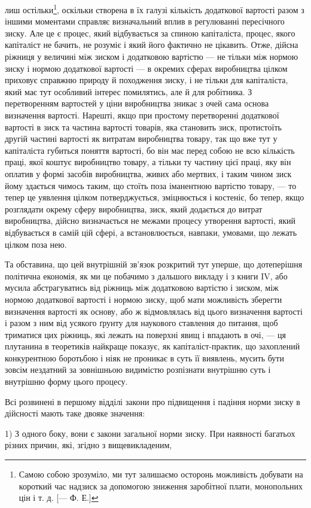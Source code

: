 \parcont{}  %
лиш остільки\footnote{
Самою собою зрозуміло, ми тут залишаємо осторонь можливість добувати
на короткий час надзиск за допомогою зниження заробітної плати, монопольних
цін і т. д. [— Ф. Е.]
}, оскільки створена в їх галузі кількість додаткової вартості разом з іншими моментами
справляє визначальний вплив в регулюванні пересічного зиску. Але це є процес, який відбувається за
спиною капіталіста, процес, якого капіталіст
не бачить, не розуміє і який його фактично не цікавить. Отже,
дійсна ріжниця у величині між зиском і додатковою вартістю — не тільки між нормою зиску і нормою
додаткової вартості — в окремих сферах виробництва цілком приховує справжню природу й походження
зиску, і не тільки для капіталіста, який має
тут особливий інтерес помилятись, але й для робітника. З перетворенням вартостей у ціни виробництва
зникає з очей сама
основа визначення вартості. Нарешті, якщо при простому перетворенні додаткової вартості в зиск та
частина вартості товарів, яка становить зиск, протистоїть другій частині вартості як
витратам виробництва товару, так що вже тут у капіталіста
губиться поняття вартості, бо він має перед собою не всю кількість праці, якої коштує виробництво
товару, а тільки ту частину
цієї праці, яку він оплатив у формі засобів виробництва, живих
або мертвих, і таким чином зиск йому здається чимось таким,
що стоїть поза іманентною вартістю товару, — то тепер це
уявлення цілком потверджується, зміцнюється і костеніє, бо
тепер, якщо розглядати окрему сферу виробництва, зиск, який
додається до витрат виробництва, дійсно визначається не межами процесу утворення вартості, який
відбувається в самій
цій сфері, а встановлюється, навпаки, умовами, що лежать цілком поза нею.

Та обставина, що цей внутрішній зв’язок розкритий тут
уперше, що дотеперішня політична економія, як ми це побачимо
з дальшого викладу і з книги IV, або мусила абстрагуватись
від ріжниць між додатковою вартістю і зиском, між нормою
додаткової вартості і нормою зиску, щоб мати можливість зберегти визначення вартості як основу, або
ж відмовлялась від
цього визначення вартості і разом з ним від усякого ґрунту
для наукового ставлення до питання, щоб триматися цих ріжниць, які лежать на поверхні явищ і
впадають в очі, — ця плутанина в теоретиків найкраще показує, як капіталіст-практик, що
захоплений конкурентною боротьбою і ніяк не проникає в суть
її виявлень, мусить бути зовсім нездатний за зовнішньою видимістю розпізнати внутрішню суть і
внутрішню форму цього процесу.

Всі розвинені в першому відділі закони про підвищення
і падіння норми зиску в дійсності мають таке двояке значення:

1) З одного боку, вони є закони загальної норми зиску. При
наявності багатьох різних причин, які, згідно з вищевикладеним,
\parbreak{}  %
